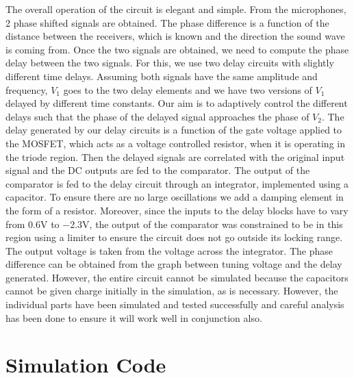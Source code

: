 \documentclass[10pt, conference]{IEEEtran}
\begin{document}
The overall operation of the circuit is elegant and simple. From the microphones, 2 phase shifted signals are obtained. The phase difference is a function of the distance between the receivers, which is known and the direction the sound wave is coming from. Once the two signals are obtained, we need to compute the phase delay between the two signals.
For this, we use two delay circuits with slightly different time delays. Assuming both signals have the same amplitude and frequency, $V_{1}$ goes to the two delay elements and we have two versions of $V_{1}$ delayed by different time constants. Our aim is to adaptively control the different delays such that the phase of the delayed signal approaches the phase of $V_{2}$. The delay generated by our delay circuits is a function of the gate voltage applied to the MOSFET, which acts as a voltage controlled resistor, when it is operating in the triode region. 
Then the delayed signals are correlated with the original input signal and the DC outputs are fed to the comparator. The output of the comparator is fed to the delay circuit through an integrator, implemented using a capacitor. To ensure there are no large oscillations we add a damping element in the form of a resistor.
Moreover, since the inputs to the delay blocks have to vary from 0.6V to $-2.3$V, the output of the comparator was constrained to be in this region using a limiter to ensure the circuit does not go outside its locking range. The output voltage is taken from the voltage across the integrator. The phase difference can be obtained from the graph between tuning voltage and the delay generated. However, the entire circuit cannot be simulated because the capacitors cannot be given charge initially in the simulation, as is necessary. 
However, the individual parts have been simulated and tested successfully and careful analysis has been done to ensure it will work well in conjunction also. 




\appendices

\section{Simulation Code}

% 		
\end{document}
